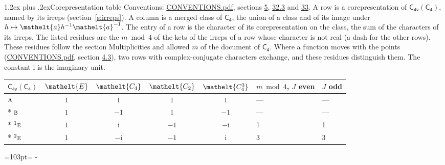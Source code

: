 \documentclass[10pt,a4paper]{article}
\makeatletter
\renewcommand\section{\@startsection{section}{1}{\z@}{-3ex plus -1ex minus -.2ex}%
  {1.2ex plus .2ex}{\normalfont\large\sffamily\bfseries\color{parttitle}}}
\newcommand{\needspace}[1]{\par\penalty-100\begingroup\dimen0=#1\relax\dimen2=\pagegoal
  \advance\dimen2-\pagetotal\ifdim\dimen0>\dimen2\relax\ifdim\dimen2>0pt\vfil\break\fi\fi
  \endgroup}
\numberwithin{equation}{section}
\newcommand{\eltfont}[1]{{\let\sigma\eltsigma\mathelt{#1}}}
\newcommand{\grp}[1]{\mathsf{#1}}
\newcommand{\irr}[1]{\text{\normalfont\scshape #1}}
\newcommand{\conjpair}[1]{{}^{#1}}
\newcommand{\cls}[1]{\eltfont{#1}}
\newcommand{\elt}[1]{\eltfont{#1}}
\newcommand{\iunit}{\mathrm{i}}
\makeatother
\begin{document}
\section{Corepresentation table}\label{s:character_table}
Conventions: \href{../../CONVENTIONS.pdf}{CONVENTIONS.pdf}, sections \href{../../../rotation/CONVENTIONS.pdf\#conv.5}{5}, \href{../../CONVENTIONS.pdf\#conv.32.3}{32.3} and \href{../../CONVENTIONS.pdf\#conv.33}{33}.
A row is a corepresentation of $\grp{C_{4v}}(\grp{C_{4}})$, named by its irreps (section~\ref{s:irreps}). A column is a merged class of $\grp{C_{4}}$, the union of a class and of its image under $h \mapsto \elt{a} h^{-1} \elt{a}^{-1}$. The entry of a row is the character of its corepresentation on the class, the sum of the characters of its irreps.
\leavevmode\label{n:head.parity}The listed residues are the $m \bmod 4$ of the kets of the irreps of a row whose character is not real (a dash for the other rows). These residues follow the section Multiplicities and allowed $m$ of the document of \href{../../../rotation/data/pdf/C4.pdf}{$\grp{C_{4}}$}. Where a function moves with the points (\href{../../CONVENTIONS.pdf}{CONVENTIONS.pdf}, section \href{../../../rotation/CONVENTIONS.pdf\#conv.4.3}{4.3}), two rows with complex-conjugate characters exchange, and these residues distinguish them.
The constant $\iunit$ is the imaginary unit.
{\small\setlength{\tabcolsep}{4pt}\begin{longtable}{@{}lccccll@{}}\toprule
$\grp{C_{4v}}(\grp{C_{4}})$ & $\cls{E}$ & $\cls{C_{4}}$ & $\cls{C_{2}}$ & $\cls{C_{4}^{3}}$ & $m \bmod 4$, $J$ even & $J$ odd\\\midrule\endhead
\bottomrule\endfoot\endlastfoot
$\irr{a}$ & $1$ & $1$ & $1$ & $1$ & --- & ---\\*
$\irr{b}$ & $1$ & $-1$ & $1$ & $-1$ & --- & ---\\*
$\conjpair{1}\irr{e}$ & $1$ & $\iunit{}$ & $-1$ & $-\iunit{}$ & 1 & 1\\*
$\conjpair{2}\irr{e}$ & $1$ & $-\iunit{}$ & $-1$ & $\iunit{}$ & 3 & 3\\
\bottomrule\end{longtable}}
\needspace{103pt}
\end{document}

